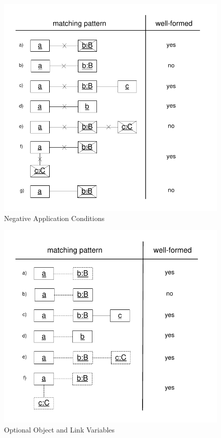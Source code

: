 \begin{figure}[htb]
  \centering
  \includegraphics[scale=1]{figures/negativeObjects}
  \caption{Negative Application Conditions}
  \label{fig:negativeObjects}
\end{figure}

\begin{figure}[htb]
  \centering
  \includegraphics[scale=1]{figures/optionalObjects}
  \caption{Optional Object and Link Variables}
  \label{fig:optionalObjects}
\end{figure}



